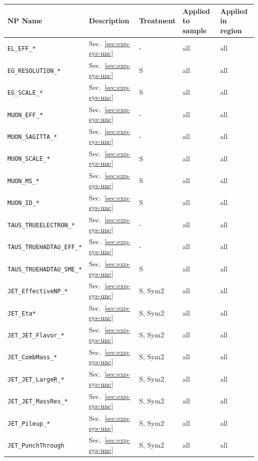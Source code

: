 \begin{table}[ht]
    \centering
    \scriptsize
    \begin{tabular}{|p{3.5cm}|p{2.0cm}|p{1.5cm}|p{2cm}|p{1.5cm}|}
        \hline
        NP Name & Description & Treatment & Applied to sample & Applied in region \\
        \hline
        \texttt{EL\_EFF\_*} & Sec.~\ref{sec:exp-sys-unc} & - & all & all \\
        \texttt{EG\_RESOLUTION\_*} & Sec.~\ref{sec:exp-sys-unc} & S & all & all \\
        \texttt{EG\_SCALE\_*} & Sec.~\ref{sec:exp-sys-unc} & S & all & all \\
        \texttt{MUON\_EFF\_*} & Sec.~\ref{sec:exp-sys-unc} & - & all & all \\
        \texttt{MUON\_SAGITTA\_*} & Sec.~\ref{sec:exp-sys-unc} & - & all & all \\
        \texttt{MUON\_SCALE\_*} & Sec.~\ref{sec:exp-sys-unc} & S & all & all \\
        \texttt{MUON\_MS\_*} & Sec.~\ref{sec:exp-sys-unc} & S & all & all \\
        \texttt{MUON\_ID\_*} & Sec.~\ref{sec:exp-sys-unc} & S & all & all \\
        \texttt{TAUS\_TRUEELECTRON\_*} & Sec.~\ref{sec:exp-sys-unc} & - & all & all \\
        \texttt{TAUS\_TRUEHADTAU\_EFF\_*} & Sec.~\ref{sec:exp-sys-unc} & - & all & all \\
        \texttt{TAUS\_TRUEHADTAU\_SME\_*} & Sec.~\ref{sec:exp-sys-unc} & S & all & all \\
        \texttt{JET\_EffectiveNP\_*} & Sec.~\ref{sec:exp-sys-unc} & S, Sym2 & all & all \\
        \texttt{JET\_Eta*} & Sec.~\ref{sec:exp-sys-unc} & S, Sym2 & all & all \\
        \texttt{JET\_JET\_Flavor\_*} & Sec.~\ref{sec:exp-sys-unc} & S, Sym2 & all & all \\
        \texttt{JET\_CombMass\_*} & Sec.~\ref{sec:exp-sys-unc} & S, Sym2 & all & all \\
        \texttt{JET\_JET\_LargeR\_*} & Sec.~\ref{sec:exp-sys-unc} & S, Sym2 & all & all \\
        \texttt{JET\_JET\_MassRes\_*} & Sec.~\ref{sec:exp-sys-unc} & S, Sym2 & all & all \\
        \texttt{JET\_Pileup\_*} & Sec.~\ref{sec:exp-sys-unc} & S, Sym2 & all & all \\
        \texttt{JET\_PunchThrough} & Sec.~\ref{sec:exp-sys-unc} & S, Sym2 & all & all \\

\end{tabular}
\end{table}
